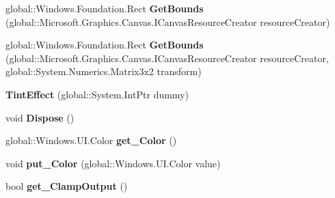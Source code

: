 \begin{DoxyCompactItemize}
\mbox{\label{class_microsoft_1_1_graphics_1_1_canvas_1_1_effects_1_1_tint_effect_afab469584252d81d12499e6f9b9a6e10}} 
global\+::\+Windows.\+Foundation.\+Rect {\bfseries Get\+Bounds} (global\+::\+Microsoft.\+Graphics.\+Canvas.\+I\+Canvas\+Resource\+Creator resource\+Creator)
\item 
\mbox{\label{class_microsoft_1_1_graphics_1_1_canvas_1_1_effects_1_1_tint_effect_a874cd7c0fda492b02303c38329523bb5}} 
global\+::\+Windows.\+Foundation.\+Rect {\bfseries Get\+Bounds} (global\+::\+Microsoft.\+Graphics.\+Canvas.\+I\+Canvas\+Resource\+Creator resource\+Creator, global\+::\+System.\+Numerics.\+Matrix3x2 transform)
\item 
\mbox{\label{class_microsoft_1_1_graphics_1_1_canvas_1_1_effects_1_1_tint_effect_ab6a7900d7383e34db9dae72dfca0b03c}} 
{\bfseries Tint\+Effect} (global\+::\+System.\+Int\+Ptr dummy)
\item 
\mbox{\label{class_microsoft_1_1_graphics_1_1_canvas_1_1_effects_1_1_tint_effect_ab057d395ffb4168e2e95ebdec2027f4f}} 
void {\bfseries Dispose} ()
\item 
\mbox{\label{class_microsoft_1_1_graphics_1_1_canvas_1_1_effects_1_1_tint_effect_a0286d78ccbae82990f13233219282806}} 
global\+::\+Windows.\+U\+I.\+Color {\bfseries get\+\_\+\+Color} ()
\item 
\mbox{\label{class_microsoft_1_1_graphics_1_1_canvas_1_1_effects_1_1_tint_effect_a080d65333257b075792ecc37d5b545c9}} 
void {\bfseries put\+\_\+\+Color} (global\+::\+Windows.\+U\+I.\+Color value)
\item 
\mbox{\label{class_microsoft_1_1_graphics_1_1_canvas_1_1_effects_1_1_tint_effect_a26fe14bbdea4256df42b059f96b801f2}} 
bool {\bfseries get\+\_\+\+Clamp\+Output} ()
\item 

\end{DoxyCompactItemize}
